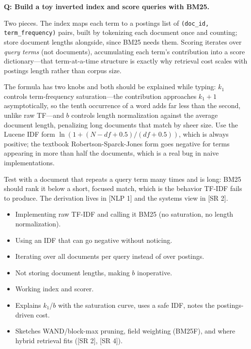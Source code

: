 \begin{interviewq}
\textbf{Q: Build a toy inverted index and score queries with BM25.}

 \quad {} \quad \badgefreq{\freqmed}

\stronganswer

Two pieces. The index maps each term to a postings list of \texttt{(doc\_id, term\_frequency)} pairs, built by tokenizing each document once and counting; store document lengths alongside, since BM25 needs them. Scoring iterates over \emph{query terms} (not documents), accumulating each term's contribution into a score dictionary---that term-at-a-time structure is exactly why retrieval cost scales with postings length rather than corpus size.

The formula has two knobs and both should be explained while typing: $k_1$ controls term-frequency saturation---the contribution approaches $k_1 + 1$ asymptotically, so the tenth occurrence of a word adds far less than the second, unlike raw TF---and $b$ controls length normalization against the average document length, penalizing long documents that match by sheer size. Use the Lucene IDF form $\ln(1 + (N - df + 0.5)/(df + 0.5))$, which is always positive; the textbook Robertson-Sparck-Jones form goes negative for terms appearing in more than half the documents, which is a real bug in naive implementations.

Test with a document that repeats a query term many times and is long: BM25 should rank it below a short, focused match, which is the behavior TF-IDF fails to produce. The derivation lives in [NLP 1] and the systems view in [SR 2].

\redflags
\begin{itemize}
    \item Implementing raw TF-IDF and calling it BM25 (no saturation, no length normalization).
    \item Using an IDF that can go negative without noticing.
    \item Iterating over all documents per query instead of over postings.
    \item Not storing document lengths, making $b$ inoperative.
\end{itemize}


\goodgreat
\begin{itemize}
    \item {} Working index and scorer.
    \item {} Explains $k_1$/$b$ with the saturation curve, uses a safe IDF, notes the postings-driven cost.
    \item {} Sketches WAND/block-max pruning, field weighting (BM25F), and where hybrid retrieval fits ([SR 2], [SR 4]).
\end{itemize}

\end{interviewq}

